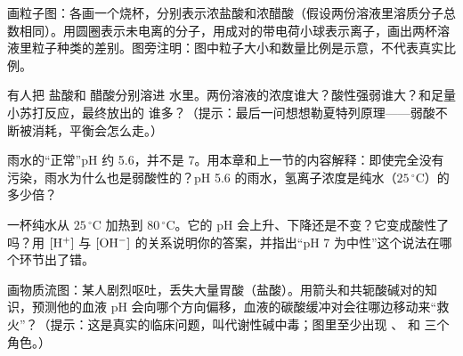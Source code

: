 \begin{sikaoti}
\item 画粒子图：各画一个烧杯，分别表示浓盐酸和浓醋酸（假设两份溶液里溶质分子总数相同）。用圆圈表示未电离的分子，用成对的带电荷小球表示离子，画出两杯溶液里粒子种类的差别。图旁注明：图中粒子大小和数量比例是示意，不代表真实比例。
\item 有人把  盐酸和  醋酸分别溶进  水里。两份溶液的浓度谁大？酸性强弱谁大？和足量小苏打反应，最终放出的  谁多？（提示：最后一问想想勒夏特列原理——弱酸不断被消耗，平衡会怎么走。）
\item 雨水的“正常”pH 约 5.6，并不是 7。用本章和上一节的内容解释：即使完全没有污染，雨水为什么也是弱酸性的？pH 5.6 的雨水，氢离子浓度是纯水（$25\,^{\circ}\mathrm{C}$）的多少倍？
\item 一杯纯水从 $25\,^{\circ}\mathrm{C}$ 加热到 $80\,^{\circ}\mathrm{C}$。它的 pH 会上升、下降还是不变？它变成酸性了吗？用 $[\mathrm{H^+}]$ 与 $[\mathrm{OH^-}]$ 的关系说明你的答案，并指出“pH 7 为中性”这个说法在哪个环节出了错。
\item 画物质流图：某人剧烈呕吐，丢失大量胃酸（盐酸）。用箭头和共轭酸碱对的知识，预测他的血液 pH 会向哪个方向偏移，血液的碳酸缓冲对会往哪边移动来“救火”？（提示：这是真实的临床问题，叫代谢性碱中毒；图里至少出现 、 和  三个角色。）
\end{sikaoti}
